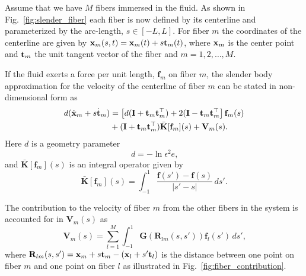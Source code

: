 Assume that we have $M$ fibers immersed in the fluid. As shown in Fig.~\ref{fig:slender_fiber} each fiber is now defined by its centerline and parameterized by the arc-length, ${s \in [-L,L]}$. For fiber $m$ the coordinates of the centerline are given by \linebreak[4]${\mathbf{x}_m(s,t) = \mathbf{x}_m(t) + s\mathbf{t}_m(t)}$, where $\mathbf{x}_m$ is the center point and $\mathbf{t}_m$ the unit tangent vector of the fiber and ${m=1,2,\dots,M}$.

If the fluid exerts a force per unit length, $\mathbf{f}_m$ on fiber $m$, the slender body approximation for the velocity of the centerline of fiber $m$ can be stated in non-dimensional form as
\begin{equation}
  \label{eq:velocity_centerline}
  \begin{aligned}
    d(\dot{\mathbf{x}}_m + s \dot{\mathbf{t}}_m) &= \left[ d(\mathbf{I} + \mathbf{t}_m\mathbf{t}_m^\top) + 2(\mathbf{I} - \mathbf{t}_m\mathbf{t}_m^\top\right]\mathbf{f}_m(s) \\
    &+ (\mathbf{I} + \mathbf{t}_m\mathbf{t}_m^\top)\bar{\mathbf{K}}[\mathbf{f}_m](s) + \mathbf{V}_m(s) \text{.}
  \end{aligned}
\end{equation}
Here $d$ is a geometry parameter
\begin{equation}
  \label{eq:geometry_parameter}
  d = -\ln{\epsilon^2e} \text{,}
\end{equation}
and $\bar{\mathbf{K}}[\mathbf{f}_m](s)$ is an integral operator given by
\begin{equation}
  \label{eq:integral_operator}
  \bar{\mathbf{K}}[\mathbf{f}_m](s) = \int_{-1}^{1} \frac{\mathbf{f}(s') - \mathbf{f}(s)}{|s' - s|} \, ds' \text{.}
\end{equation}

The contribution to the velocity of fiber $m$ from the other fibers in the system is accounted for in $\mathbf{V}_m(s)$ as
\begin{equation}
  \label{eq:velocity_contribution}
  \mathbf{V}_m(s) = \sum_{l=1}^M \int_{-1}^{1} \mathbf{G}(\mathbf{R}_{lm}(s,s'))\mathbf{f}_l(s') \, ds' \text{,}
\end{equation}
where $\mathbf{R}_{lm}(s,s') = \mathbf{x}_m + s\mathbf{t}_m - (\mathbf{x}_l + s'\mathbf{t}_l)$ is the distance between one point on fiber $m$ and one point on fiber $l$ as illustrated in Fig.~\ref{fig:fiber_contribution}.

